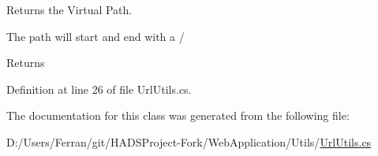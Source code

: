 Returns the Virtual Path. 

The path will start and end with a /

\begin{DoxyReturn}{Returns}

\end{DoxyReturn}


Definition at line 26 of file Url\+Utils.\+cs.



The documentation for this class was generated from the following file\+:\begin{DoxyCompactItemize}
\item 
D\+:/\+Users/\+Ferran/git/\+H\+A\+D\+S\+Project-\/\+Fork/\+Web\+Application/\+Utils/\mbox{\hyperlink{UrlUtils_8cs}{Url\+Utils.\+cs}}\end{DoxyCompactItemize}
